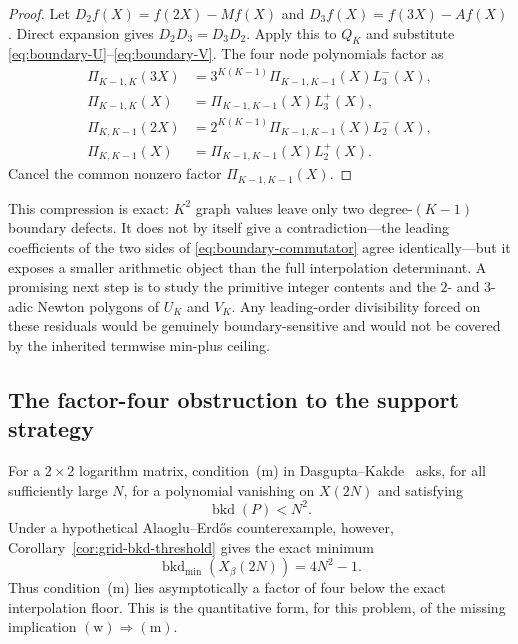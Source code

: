 \documentclass[11pt,oneside]{article}
\theoremstyle{definition}
\theoremstyle{remark}
\begin{document}
\begin{proof}
Let $D_2f(X)=f(2X)-Mf(X)$ and $D_3f(X)=f(3X)-Af(X)$.  Direct expansion gives
$D_2D_3=D_3D_2$.  Apply this to $Q_K$ and substitute
\eqref{eq:boundary-U}--\eqref{eq:boundary-V}.  The four node polynomials factor as
\begin{align*}
 \Pi_{K-1,K}(3X)
 &=3^{K(K-1)}\Pi_{K-1,K-1}(X)L_3^-(X),\\
 \Pi_{K-1,K}(X)
 &=\Pi_{K-1,K-1}(X)L_3^+(X),\\
 \Pi_{K,K-1}(2X)
 &=2^{K(K-1)}\Pi_{K-1,K-1}(X)L_2^-(X),\\
 \Pi_{K,K-1}(X)
 &=\Pi_{K-1,K-1}(X)L_2^+(X).
\end{align*}
Cancel the common nonzero factor $\Pi_{K-1,K-1}(X)$.
\end{proof}

This compression is exact: $K^2$ graph values leave only two degree-$(K-1)$ boundary defects.
It does not by itself give a contradiction---the leading coefficients of the two sides of
\eqref{eq:boundary-commutator} agree identically---but it exposes a smaller arithmetic object
than the full interpolation determinant.  A promising next step is to study the primitive
integer contents and the $2$- and $3$-adic Newton polygons of $U_K$ and $V_K$.  Any
leading-order divisibility forced on these residuals would be genuinely boundary-sensitive and
would not be covered by the inherited termwise min-plus ceiling.

\subsection{The factor-four obstruction to the support strategy}

For a $2\times2$ logarithm matrix, condition~(m) in
Dasgupta--Kakde~\cite{DasguptaKakdeMCC} asks, for all sufficiently large $N$, for a polynomial
vanishing on $X(2N)$ and satisfying
\begin{equation}
 \operatorname{bkd}(P)<N^2.
 \label{eq:mc-condition-m}
\end{equation}
Under a hypothetical Alaoglu--Erd\H{o}s counterexample, however,
Corollary~\ref{cor:grid-bkd-threshold} gives the exact minimum
\begin{equation}
 \operatorname{bkd}_{\min}(X_\beta(2N))=4N^2-1.
 \label{eq:mc-factor-four}
\end{equation}
Thus condition~(m) lies asymptotically a factor of four below the exact interpolation floor.
This is the quantitative form, for this problem, of the missing implication
$(\mathrm w)\Rightarrow(\mathrm m)$.
\end{document}
